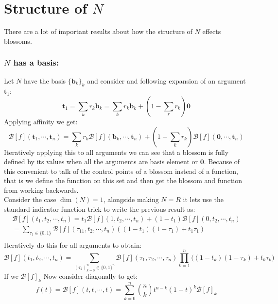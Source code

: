 
\section{Structure of $N$}
There are a lot of important results about how the structure of $N$ effects blossoms.

\subsubsection{$N$ has a basis:}
Let $N$ have the basis $\{\mathbf{b}_k\}_k$ and consider and following expansion of an argument $\mathbf{t}_1$:
\[\mathbf{t}_1 = \sum_kr_k\mathbf{b}_k = \sum_kr_k\mathbf{b}_k + \left(1-\sum_rr_k\right)\mathbf{0}\]
Applying affinity we get:
\[\mathcal{B}[f](\mathbf{t}_1,\cdots,\mathbf{t}_n) = \sum_kr_k\mathcal{B}[f](\mathbf{b}_k,\cdots,\mathbf{t}_n)+\left(1-\sum_kr_k\right)\mathcal{B}[f](\mathbf{0},\cdots,\mathbf{t}_n) \]
Iteratively applying this to all arguments we can see that a blossom is fully defined by its values when all the arguments are basis element or $\mathbf{0}$.
Because of this convenient to talk of the control points of a blossom instead of a function, that is we define the function on this set and then get the blossom and function from working backwards.
\\

Consider the case $\dim(N)=1$,
alongside making $N=R$ it lets use the standard indicator function trick to write the previous result as:
\[\begin{aligned}
	\mathcal{B}[f](t_1,t_2,\cdots,t_n) 
	= t_1\mathcal{B}[f](1,t_2,\cdots,t_n)+(1-t_1)\mathcal{B}[f](0,t_2,\cdots,t_n)\\
	= \sum_{\tau_1 \in \{0,1\}}\mathcal{B}[f](\tau_11,t_2,\cdots,t_n)((1-t_1)(1-\tau_1)+t_1\tau_1)\\
\end{aligned}\]
Iteratively do this for all arguments to obtain:
\[\mathcal{B}[f](t_1,t_2,\cdots, t_n) = \sum_{(\tau_k)_{k=0}^n\in\{0,1\}^n}\mathcal{B}[f](\tau_1,\tau_2,\cdots, \tau_n)\prod_{k=1}^n\big((1-t_k)(1-\tau_k)+t_k\tau_k\big)\]
If we $\mathcal{B}[f]_k$
Now consider diagonally to get:
\[f(t) = \mathcal{B}[f](t,t,\cdots,t) = \sum_{k=0}^n\binom{n}{k}t^{n-k}(1-t)^k\mathcal{B}[f]_k\]

